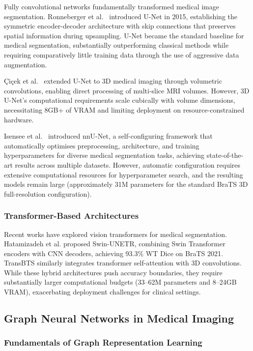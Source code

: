 Fully convolutional networks fundamentally transformed medical image segmentation. Ronneberger et al.\ \cite{ronneberger2015unet} introduced U-Net in 2015, establishing the symmetric encoder-decoder architecture with skip connections that preserves spatial information during upsampling. U-Net became the standard baseline for medical segmentation, substantially outperforming classical methods while requiring comparatively little training data through the use of aggressive data augmentation.

\c{C}i\c{c}ek et al.\ \cite{cicek20163d} extended U-Net to 3D medical imaging through volumetric convolutions, enabling direct processing of multi-slice MRI volumes. However, 3D U-Net's computational requirements scale cubically with volume dimensions, necessitating 8GB+ of VRAM and limiting deployment on resource-constrained hardware.

Isensee et al.\ \cite{isensee2021nnunet} introduced nnU-Net, a self-configuring framework that automatically optimises preprocessing, architecture, and training hyperparameters for diverse medical segmentation tasks, achieving state-of-the-art results across multiple datasets. However, automatic configuration requires extensive computational resources for hyperparameter search, and the resulting models remain large (approximately 31M parameters for the standard BraTS 3D full-resolution configuration).

\subsubsection{Transformer-Based Architectures}

Recent works have explored vision transformers for medical segmentation. Hatamizadeh et al. \cite{hatamizadeh2022swin} proposed Swin-UNETR, combining Swin Transformer encoders with CNN decoders, achieving 93.3\% WT Dice on BraTS 2021. TransBTS \cite{wang2021transbts} similarly integrates transformer self-attention with 3D convolutions. While these hybrid architectures push accuracy boundaries, they require substantially larger computational budgets (33--62M parameters and 8--24GB VRAM), exacerbating deployment challenges for clinical settings.

\subsection{Graph Neural Networks in Medical Imaging}

\subsubsection{Fundamentals of Graph Representation Learning}

